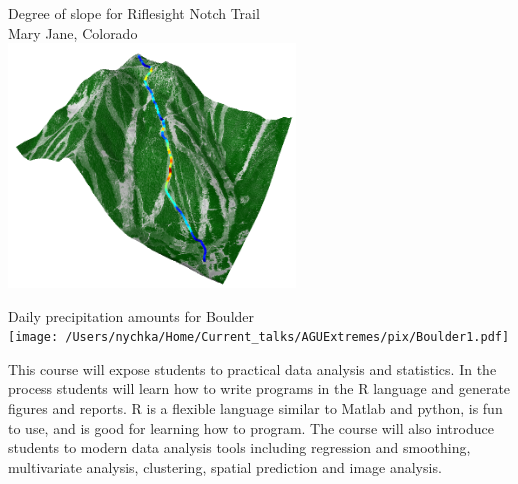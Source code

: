 \documentclass[12pt]{article}
\begin{document}
{\hspace*{-.25in}
\begin{minipage}{3in}
\vspace*{0in}
Degree of slope for Riflesight Notch Trail \\
Mary Jane, Colorado  \\
\includegraphics[width=3in]{slopeimage3.png}
\end{minipage}
%
\begin{minipage}{6in}
\vspace*{.25in}
\hspace*{.5in} Daily precipitation amounts  for Boulder \\
\texttt{[image: /Users/nychka/Home/Current\_talks/AGUExtremes/pix/Boulder1.pdf]} 
\end{minipage}

{\Large
This course will expose students to practical data analysis and statistics. In the process students will learn how to 
 write programs in the R language and generate figures and reports. 
R is a flexible language similar to Matlab and python, is fun to use, and is
 good for learning how to program. 
 The course will  also introduce students to  modern data analysis tools including 
regression and smoothing, multivariate analysis, clustering, spatial prediction and image analysis.
}
}
\end{document}
